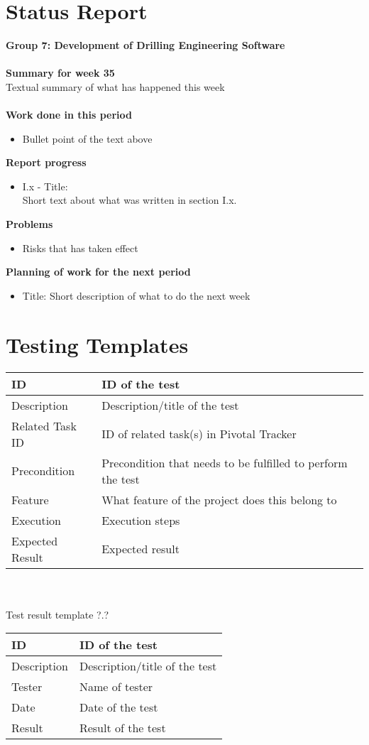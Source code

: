 \documentclass{report}
\begin{document}
\newpage
\section{Status Report}
\textbf{Group 7: Development of Drilling Engineering Software}\\\\
\textbf{Summary for week 35}\\
Textual summary of what has happened this week\\\\
\textbf{Work done in this period}
\begin{itemize}
    \item Bullet point of the text above
\end{itemize}
\textbf{Report progress}
\begin{itemize}
    \item I.x - Title:\\
Short text about what was written in section I.x.
\end{itemize}
\textbf{Problems}
\begin{itemize}
    \item Risks that has taken effect
\end{itemize}
\textbf{Planning of work for the next period}
\begin{itemize}
    \item Title: Short description of what to do the next week
\end{itemize}



\newpage
\section{Testing Templates}
\begin{tabular}{| l | p{9 cm} |} \hline
ID & ID of the test \\ \hline
Description & Description/title of the test \\ \hline
Related Task ID & ID of related task(s) in Pivotal Tracker \\ \hline %
Precondition & Precondition that needs to be fulfilled to perform the test \\ \hline
Feature & What feature of the project does this belong to \\ \hline
Execution & Execution steps\\ \hline
Expected Result & Expected result\\ \hline
\end{tabular}\\\\
Test result template ?.?\\
\begin{tabular}{| l | l |} \hline
ID & ID of the test \\ \hline
Description & Description/title of the test \\ \hline
Tester & Name of tester \\ \hline
Date & Date of the test\\ \hline
Result & Result of the test\\ \hline
\end{tabular}
\end{document}
